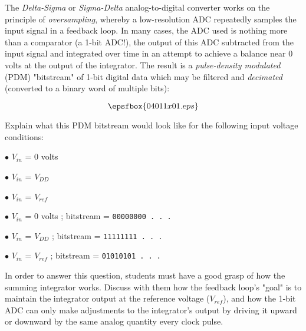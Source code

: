 

The {\it Delta-Sigma} or {\it Sigma-Delta} analog-to-digital converter works on the principle of {\it oversampling}, whereby a low-resolution ADC repeatedly samples the input signal in a feedback loop.  In many cases, the ADC used is nothing more than a comparator (a 1-bit ADC!), the output of this ADC subtracted from the input signal and integrated over time in an attempt to achieve a balance near 0 volts at the output of the integrator.  The result is a {\it pulse-density modulated} (PDM) "bitstream" of 1-bit digital data which may be filtered and {\it decimated} (converted to a binary word of multiple bits):

$$\epsfbox{04011x01.eps}$$

\goodbreak
Explain what this PDM bitstream would look like for the following input voltage conditions:

\medskip
\item{$\bullet$} $V_{in}$ = 0 volts 
\item{$\bullet$} $V_{in}$ = $V_{DD}$ 
\item{$\bullet$} $V_{in}$ = $V_{ref}$ 
\medskip







\medskip
\item{$\bullet$} $V_{in}$ = 0 volts ; bitstream = {\tt 00000000 . . .}
\item{$\bullet$} $V_{in}$ = $V_{DD}$ ; bitstream = {\tt 11111111 . . .}
\item{$\bullet$} $V_{in}$ = $V_{ref}$ ; bitstream = {\tt 01010101 . . .}
\medskip







In order to answer this question, students must have a good grasp of how the summing integrator works.  Discuss with them how the feedback loop's "goal" is to maintain the integrator output at the reference voltage ($V_{ref}$), and how the 1-bit ADC can only make adjustments to the integrator's output by driving it upward or downward by the same analog quantity every clock pulse.




